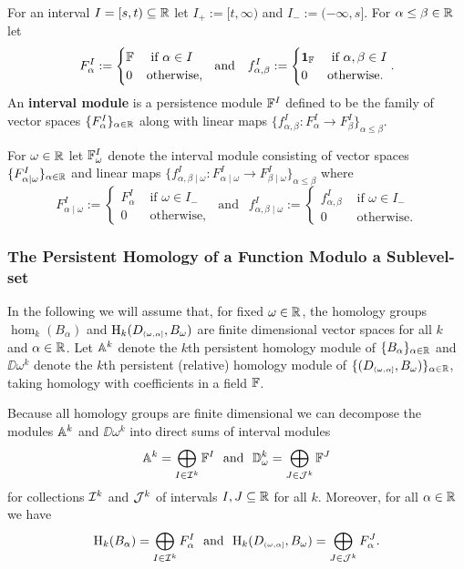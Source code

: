 
For an interval $I = [s,t)\subseteq \R$ let $I_+ := [t,\infty)$ and $I_- := (-\infty, s]$.
For $\alpha\leq\beta\in\R$ let
\[ F_\alpha^I := \begin{cases} \FF&\text{ if } \alpha\in I\\ 0 &\text{otherwise,}\end{cases}\ \text{ and }\ \ f_{\alpha,\beta}^I := \begin{cases} \id_\FF&\text{ if } \alpha,\beta\in I\\ 0&\text{otherwise.}\end{cases}.\]
An \textbf{interval module} is a persistence module $\FF^I$ defined to be the family of vector spaces $\{F_\alpha^I\}_{\alpha\in\R}$ along with linear maps $\{f_{\alpha,\beta}^I : F_\alpha^I\to F_\beta^I\}_{\alpha\leq\beta}$.

For $\omega\in\R$ let $\FF_\omega^I$ denote the interval module consisting of vector spaces $\{F_{\alpha\mid\omega}^I\}_{\alpha\in\R}$ and linear maps $\{f_{\alpha,\beta\mid \omega}^I : F_{\alpha\mid\omega}^I\to F_{\beta\mid\omega}^I\}_{\alpha\leq\beta}$ where
\[ F_{\alpha\mid \omega}^I := \begin{cases} F_\alpha^I&\text{ if } \omega\in I_-\\ 0&\text{ otherwise,}\end{cases}\ \text{ and }\ \ f_{\alpha,\beta\mid\omega}^I := \begin{cases} f_{\alpha,\beta}^I&\text{ if } \omega\in I_-\\ 0&\text{ otherwise.}\end{cases}\]

\subsubsection{The Persistent Homology of a Function Modulo a Sublevel-set}

In the following we will assume that, for fixed $\omega\in\R$, the homology groups $\hom_k(B_\alpha)$ and $\hom_k(D\subi{\omega,\alpha}, B_\omega)$ are finite dimensional vector spaces for all $k$ and $\alpha\in\R$.
Let $\AA^k$ denote the $k$th persistent homology module of $\{B_\alpha\}_{\alpha\in\R}$ and $\DD{\omega}^k$ denote the $k$th persistent (relative) homology module of $\{(D\subi{\omega,\alpha},B_\omega)\}_{\alpha\in\R}$, taking homology with coefficients in a field $\FF$.

Because all homology groups are finite dimensional we can decompose the modules $\AA^k$ and $\DD{\omega}^k$ into direct sums of interval modules
\[ \AA^k = \bigoplus_{I\in\I^k} \FF^I\ \text{ and }\ \DD{\omega}^k = \bigoplus_{J\in\J^k} \FF^J\]
for collections $\I^k$ and $\J^k$ of intervals $I,J\subseteq \R$ for all $k$.
Moreover, for all $\alpha\in\R$ we have
\[ \hom_k(B_\alpha) = \bigoplus_{I\in \I^k}F_\alpha^I\ \text{ and }\ \hom_k(D\subi{\omega,\alpha}, B_\omega) = \bigoplus_{J\in\J^k} F_\alpha^J.\]

